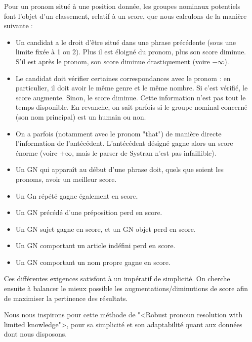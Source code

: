 \documentclass[a4paper,12pt]{article}
\begin{document}
Pour un pronom situé à une position donnée, les groupes nominaux potentiels font l'objet d'un classement, relatif à un score, que nous calculons de la manière suivante :

\begin{itemize}
 \item Un candidat a le droit d'être situé dans une phrase précédente (sous une limite fixée à 1 ou 2). Plus il est éloigné du pronom, plus son score diminue. S'il est après le pronom, son score diminue drastiquement (voire $-\infty$).
 \item Le candidat doit vérifier certaines correspondances avec le pronom : en particulier, il doit avoir le même genre et le même nombre. Si c'est vérifié, le score augmente. Sinon, le score diminue. Cette information n'est pas tout le temps disponible. En revanche, on sait parfois si le groupe nominal concerné (son nom principal) est un humain ou non.
 \item On a parfois (notamment avec le pronom "that") de manière directe l'information de l'antécédent. L'antécédent désigné gagne alors un score énorme (voire $+\infty$, mais le parser de Systran n'est pas infaillible).
 \item Un GN qui apparaît au début d'une phrase doit, quels que soient les pronoms, avoir un meilleur score.
 \item Un Gn répété gagne également en score.
 \item Un GN précédé d'une préposition perd en score.
 \item Un GN sujet gagne en score, et un GN objet perd en score. 
 \item Un GN comportant un article indéfini perd en score.
 \item Un GN comportant un nom propre gagne en score.
\end{itemize}

Ces différentes exigences satisfont à un impératif de simplicité. On cherche ensuite à balancer le mieux possible les augmentations/diminutions de score afin de maximiser la pertinence des résultats.

Nous nous inspirons pour cette méthode de "<Robust pronoun resolution with limited knowledge">, pour sa simplicité et son adaptabilité quant aux données dont nous disposons.
\end{document}
